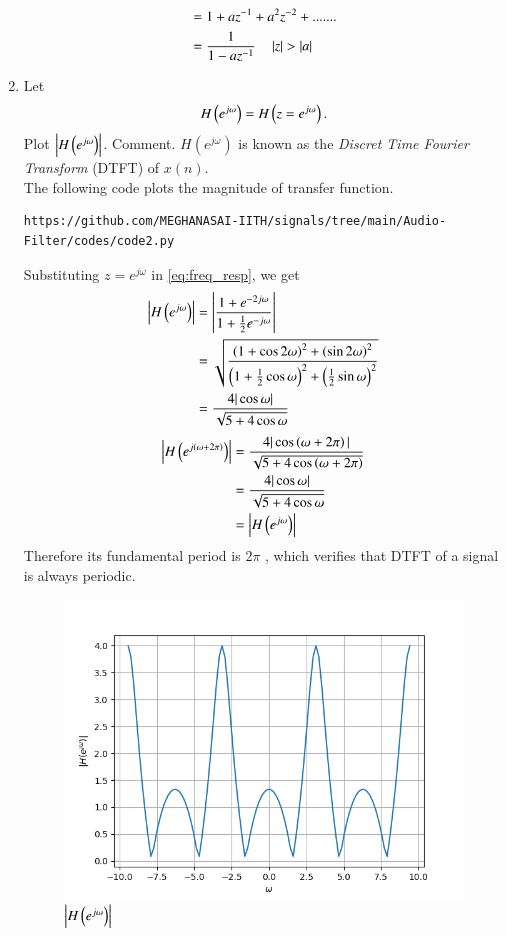 \documentclass[journal,12pt,twocolumn]{IEEEtran}
\theoremstyle{remark}
\begin{document}
\begin{enumerate}[label=\thesection.\arabic*,ref=\thesection.\theenumi]
\begin{align}
 &= 1+ az^{-1}+a^2z^{-2}+.......\\
			&= \frac{1}{1-az^{-1}} \quad \left\vert z\right\vert > \left\vert a\right\vert
\end{align}
%
\item 
Let
\begin{equation}
	H\left(e^{j \omega}\right) = H\left(z = e^{j \omega}\right).
\end{equation}
Plot $\left\vert H\left(e^{j \omega}\right)\right\vert$.  Comment.  $H(e^{j \omega})$ is
known as the {\em Discret Time Fourier Transform} (DTFT) of $x(n)$.
\\
\solution The following code plots the magnitude of transfer function.
\begin{lstlisting}
https://github.com/MEGHANASAI-IITH/signals/tree/main/Audio-Filter/codes/code2.py
\end{lstlisting}
Substituting $z = e^{j \omega}$ in \eqref{eq:freq_resp}, we get
\begin{align}
	\left|H\left(e^{j\omega}\right)\right| &= \left|\frac{1 + e^{-2j\omega}}{1 + \frac{1}{2}e^{-j\omega}}\right| \\
									  &= \sqrt{\frac{\left(1 + \cos{2\omega}\right)^2 + \left(\sin{2\omega}\right)^2}{\left(1 + \frac{1}{2}\cos{\omega}\right)^2 + \left(\frac{1}{2}\sin{\omega}\right)^2}}\\
									  &= \frac{4|\cos{\omega}|}{\sqrt{5 + 4\cos{\omega}}}
\end{align}
\begin{align}
	\left|H\left(e^{j\left(\omega + 2\pi\right)}\right)\right| &= \frac{4|\cos\left(\omega + 2\pi\right)|}{\sqrt{5 + 4\cos\left(\omega + 2\pi\right)}} \\
											   &= \frac{4|\cos{\omega}|}{\sqrt{5 + 4\cos{\omega}}} \\
											   &= \left|H\left(e^{j\omega}\right)\right|	
\end{align}
Therefore its fundamental period is $2\pi$ , which verifies that DTFT of a signal is always periodic.
\begin{figure}[H]
\centering
\includegraphics[width=\columnwidth]{figs/H(z)_3.5.png}
\caption{$\left\vert H\left(e^{j\omega}\right)\right\vert$}
\label{fig:H(z)_3.5}
\end{figure}
\end{enumerate}
\end{document}
